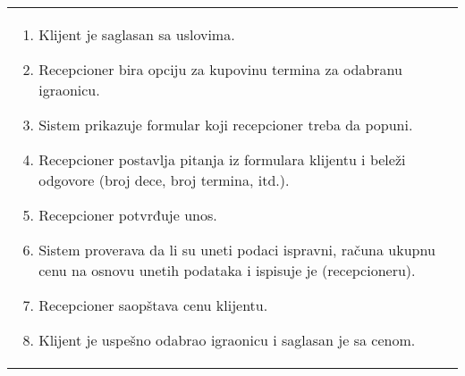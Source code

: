 \documentclass[../../main.tex]{subfiles}
\begin{document}
\begin{longtable}{| p{} | p{} |}
\begin{enumerate}
        \item Klijent je saglasan sa uslovima.
        \item Recepcioner bira opciju za kupovinu termina za odabranu igraonicu.
        \item Sistem prikazuje formular koji recepcioner treba da popuni.
        \item Recepcioner postavlja pitanja iz formulara klijentu i beleži odgovore (broj dece, broj termina, itd.).
        \item Recepcioner potvrđuje unos.
        \item Sistem proverava da li su uneti podaci ispravni, računa ukupnu cenu na osnovu unetih podataka i ispisuje je (recepcioneru).
        \item Recepcioner saopštava cenu klijentu.
        \item Klijent je uspešno odabrao igraonicu i saglasan je sa cenom. %
        

\end{enumerate}
\end{longtable}
\end{document}

